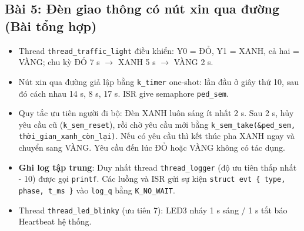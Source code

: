 \subsection{Bài 5: Đèn giao thông có nút xin qua đường (Bài tổng hợp)}

\begin{tcolorbox}[
    enhanced, colback=black!2, colframe=black!60, boxrule=1pt, arc=2.5mm, drop shadow,
    attach boxed title to top left={xshift=4mm, yshift=-3mm},
    boxed title style={enhanced, colback=black!85, colframe=black!85, boxrule=1pt, arc=2.5mm, drop shadow, left=6pt, right=6pt, top=2pt, bottom=2pt},
    title=\textcolor{white}{\large\textbf{Yêu cầu đề bài (Trích phiếu bài tập)}}
]
\bfseries
\vspace{0.2cm}
\begin{itemize}
    \item Thread \texttt{thread\_traffic\_light} điều khiển: Y0 = ĐỎ, Y1 = XANH, cả hai = VÀNG; chu kỳ ĐỎ 7 s $\rightarrow$ XANH 5 s $\rightarrow$ VÀNG 2 s.
    \item Nút xin qua đường giả lập bằng \texttt{k\_timer} one-shot: lần đầu ở giây thứ 10, sau đó cách nhau 14 s, 8 s, 17 s. ISR give semaphore \texttt{ped\_sem}.
    \item Quy tắc ưu tiên người đi bộ: Đèn XANH luôn sáng ít nhất 2 s. Sau 2 s, hủy yêu cầu cũ (\texttt{k\_sem\_reset}), rồi chờ yêu cầu mới bằng \texttt{k\_sem\_take(\&ped\_sem, thời\_gian\_xanh\_còn\_lại)}. Nếu có yêu cầu thì kết thúc pha XANH ngay và chuyển sang VÀNG. Yêu cầu đến lúc ĐỎ hoặc VÀNG không có tác dụng.
    \item \textbf{Ghi log tập trung}: Duy nhất thread \texttt{thread\_logger} (độ ưu tiên thấp nhất - 10) được gọi \texttt{printf}. Các luồng và ISR gửi sự kiện \texttt{struct evt \{ type, phase, t\_ms \}} vào \texttt{log\_q} bằng \texttt{K\_NO\_WAIT}.
    \item Thread \texttt{thread\_led\_blinky} (ưu tiên 7): LED3 nháy 1 s sáng / 1 s tắt báo Heartbeat hệ thống.
\end{itemize}
\end{tcolorbox}

\vspace{0.3cm}
